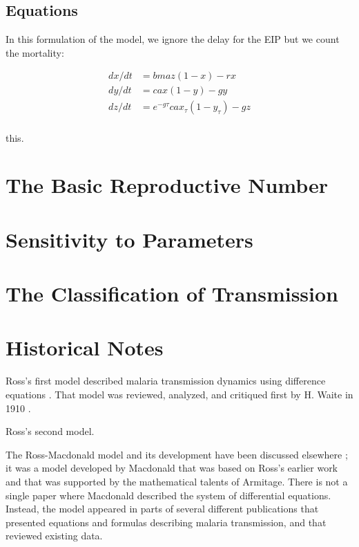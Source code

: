 \documentclass[
]{book}
\begin{document}
\subsection{Equations}\label{equations-2}

In this formulation of the model, we ignore the delay for the EIP but we count the mortality:

\[ 
\begin{array}{rl}
dx/dt &= b m a z (1-x) - r x \\
dy/dt &= c a x (1-y) - g y  \\
dz/dt &= e^{-g \tau} c a x_\tau (1-y_\tau) - g z  \\
\end{array}
\]

this.

\section{The Basic Reproductive Number}\label{the-basic-reproductive-number}

\section{Sensitivity to Parameters}\label{sensitivity-to-parameters}

\section{The Classification of Transmission}\label{the-classification-of-transmission}

\section{Historical Notes}\label{historical-notes-2}

Ross's first model described malaria transmission dynamics using difference equations \autocite{RossR1908}. That model was reviewed, analyzed, and critiqued first by H. Waite in 1910 \autocite{WaiteH1910MosquitoesMalaria}.

Ross's second model.

The Ross-Macdonald model and its development have been discussed elsewhere \autocite{AronJL1982PopulationDynamics,BaileyNTJ1982BiomathematicsMalaria,SmithDL2012_RossMacdonald}; it was a model developed by Macdonald that was based on Ross's earlier work and that was supported by the mathematical talents of Armitage. There is not a single paper where Macdonald described the system of differential equations. Instead, the model appeared in parts of several different publications that presented equations and formulas describing malaria transmission, and that reviewed existing data.
\end{document}
